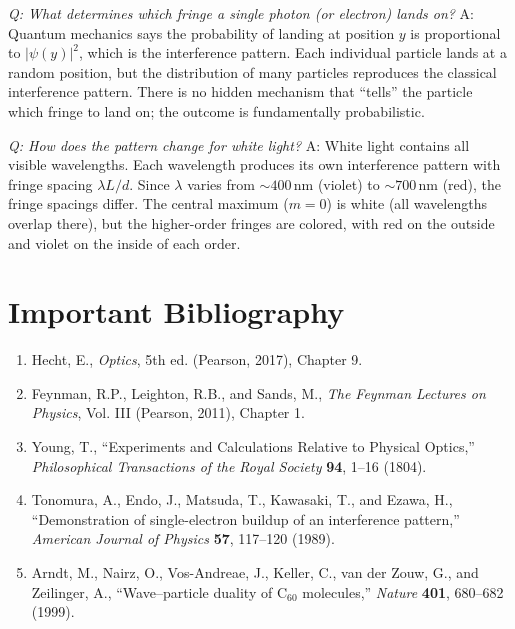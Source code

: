 \textit{Q: What determines which fringe a single photon (or electron) lands on?}
A: Quantum mechanics says the probability of landing at position $y$ is proportional to $|\psi(y)|^2$, which is the interference pattern. Each individual particle lands at a random position, but the distribution of many particles reproduces the classical interference pattern. There is no hidden mechanism that ``tells'' the particle which fringe to land on; the outcome is fundamentally probabilistic.

\textit{Q: How does the pattern change for white light?}
A: White light contains all visible wavelengths. Each wavelength produces its own interference pattern with fringe spacing $\lambda L/d$. Since $\lambda$ varies from $\sim 400\,\text{nm}$ (violet) to $\sim 700\,\text{nm}$ (red), the fringe spacings differ. The central maximum ($m = 0$) is white (all wavelengths overlap there), but the higher-order fringes are colored, with red on the outside and violet on the inside of each order.
\section*{Important Bibliography}
\begin{enumerate}
\item Hecht, E., \textit{Optics}, 5th ed. (Pearson, 2017), Chapter 9.
\item Feynman, R.P., Leighton, R.B., and Sands, M., \textit{The Feynman Lectures on Physics}, Vol. III (Pearson, 2011), Chapter 1.
\item Young, T., ``Experiments and Calculations Relative to Physical Optics,'' \textit{Philosophical Transactions of the Royal Society} \textbf{94}, 1--16 (1804).
\item Tonomura, A., Endo, J., Matsuda, T., Kawasaki, T., and Ezawa, H., ``Demonstration of single-electron buildup of an interference pattern,'' \textit{American Journal of Physics} \textbf{57}, 117--120 (1989).
\item Arndt, M., Nairz, O., Vos-Andreae, J., Keller, C., van der Zouw, G., and Zeilinger, A., ``Wave--particle duality of C$_{60}$ molecules,'' \textit{Nature} \textbf{401}, 680--682 (1999).
\end{enumerate}

